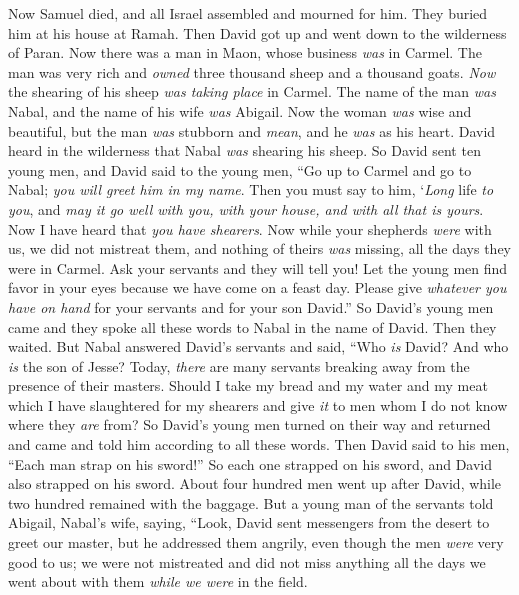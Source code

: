 \begin{biblechapter} %
 Now Samuel died, and all Israel assembled and mourned for him. They buried him at his house at Ramah. Then David got up and went down to the wilderness of Paran.
 Now there was a man in Maon, whose business \textit{was} in Carmel. The man was very rich and \textit{owned} three thousand sheep and a thousand goats. \textit{Now} the shearing of his sheep \textit{was taking place} in Carmel.
\verse The name of the man \textit{was} Nabal, and the name of his wife \textit{was} Abigail. Now the woman \textit{was} wise and beautiful, but the man \textit{was} stubborn and \textit{mean}, and he \textit{was} as his heart.
\verse David heard in the wilderness that Nabal \textit{was} shearing his sheep.
\verse So David sent ten young men, and David said to the young men, “Go up to Carmel and go to Nabal; \textit{you will greet him in my name}.
\verse Then you must say to him, ‘\textit{Long} life \textit{to you}, and \textit{may it go well with you, with your house, and with all that is yours}.
\verse Now I have heard that \textit{you have shearers}. Now while your shepherds \textit{were} with us, we did not mistreat them, and nothing of theirs \textit{was} missing, all the days they were in Carmel.
\verse Ask your servants and they will tell you! Let the young men find favor in your eyes because we have come on a feast day. Please give \textit{whatever you have on hand} for your servants and for your son David.”
\verse So David’s young men came and they spoke all these words to Nabal in the name of David. Then they waited.
\verse But Nabal answered David’s servants and said, “Who \textit{is} David? And who \textit{is} the son of Jesse? Today, \textit{there} are many servants breaking away from the presence of their masters.
\verse Should I take my bread and my water and my meat which I have slaughtered for my shearers and give \textit{it} to men whom I do not know where they \textit{are} from?
\verse So David’s young men turned on their way and returned and came and told him according to all these words.
\verse Then David said to his men, “Each man strap on his sword!” So each one strapped on his sword, and David also strapped on his sword. About four hundred men went up after David, while two hundred remained with the baggage.
\verse But a young man of the servants told Abigail, Nabal’s wife, saying, “Look, David sent messengers from the desert to greet our master, but he addressed them angrily,
\verse even though the men \textit{were} very good to us; we were not mistreated and did not miss anything all the days we went about with them \textit{while we were} in the field.

\end{biblechapter}
